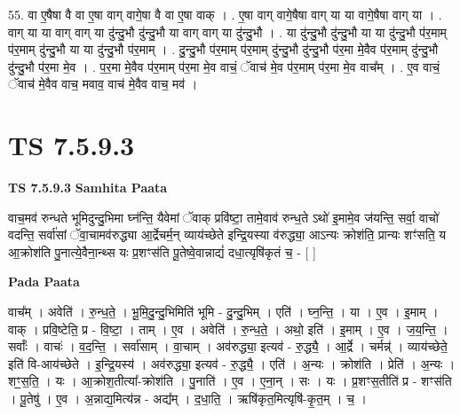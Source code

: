 \documentclass[17pt]{extarticle}
\begin{document}
55. वा ए॒षैषा वै वा ए॒षा वाग् वागे॒षा वै वा ए॒षा वाक् । . ए॒षा वाग् वागे॒षैषा वाग् या या वागे॒षैषा वाग् या । . वाग् या या वाग् वाग् या दु॑न्दु॒भौ दु॑न्दु॒भौ या वाग् वाग् या दु॑न्दु॒भौ । . या दु॑न्दु॒भौ दु॑न्दु॒भौ या या दु॑न्दु॒भौ प॑र॒माम् प॑र॒माम् दु॑न्दु॒भौ या या दु॑न्दु॒भौ प॑र॒माम् । . दु॒न्दु॒भौ प॑र॒माम् प॑र॒माम् दु॑न्दु॒भौ दु॑न्दु॒भौ प॑र॒मा मे॒वैव प॑र॒माम् दु॑न्दु॒भौ दु॑न्दु॒भौ प॑र॒मा मे॒व । . प॒र॒मा मे॒वैव प॑र॒माम् प॑र॒मा मे॒व वाचं॒ ॅवाच॑ मे॒व प॑र॒माम् प॑र॒मा मे॒व वाच᳚म् । . ए॒व वाचं॒ ॅवाच॑ मे॒वैव वाच॒ मवाव॒ वाच॑ मे॒वैव वाच॒ मव॑ । \newline
\pagebreak
{}

\section{ TS 7.5.9.3 }

\textbf{TS 7.5.9.3 } \newline
\textbf{Samhita Paata} \newline

वाच॒मव॑ रुन्धते भूमिदुन्दु॒भिमा घ्न॑न्ति॒ यैवेमां ॅवाक् प्रवि॑ष्टा॒ तामे॒वाव॑ रुन्ध॒ते ऽथो॑ इ॒मामे॒व ज॑यन्ति॒ सर्वा॒ वाचो॑ वदन्ति॒ सर्वा॑सां ॅवा॒चामव॑रुद्ध्या आ॒र्द्रेचर्म॒न् व्याय॑च्छेते इन्द्रि॒यस्या व॑रुद्ध्या॒ आऽन्यः क्रोश॑ति॒ प्रान्यः शꣳ॑सति॒ य आ॒क्रोश॑ति पु॒नात्ये॒वैना॒न्थ्स यः प्र॒शꣳस॑ति पू॒तेष्वे॒वान्नाद्यं॑ दधा॒त्यृषि॑कृतं च॒ - [  ] \newline

\textbf{Pada Paata} \newline

वाच᳚म् । अवेति॑ । रु॒न्ध॒ते॒ । भू॒मि॒दु॒न्दु॒भिमिति॑ भूमि - दु॒न्दु॒भिम् । एति॑ । घ्न॒न्ति॒ । या । ए॒व । इ॒माम् । वाक् । प्रवि॒ष्टेति॒ प्र - वि॒ष्टा॒ । ताम् । ए॒व । अवेति॑ । रु॒न्ध॒ते॒ । अथो॒ इति॑ । इ॒माम् । ए॒व । ज॒य॒न्ति॒ । सर्वाः᳚ । वाचः॑ । व॒द॒न्ति॒ । सर्वा॑साम् । वा॒चाम् । अव॑रुद्ध्या॒ इत्यव॑ - रु॒द्ध्यै॒ । आ॒र्द्रे । चर्मन्न्॑ । व्याय॑च्छेते॒ इति॑ वि-आय॑च्छेते । इ॒न्द्रि॒यस्य॑ । अव॑रुद्ध्या॒ इत्यव॑ - रु॒द्ध्यै॒ । एति॑ । अ॒न्यः । क्रोश॑ति । प्रेति॑ । अ॒न्यः । शꣳ॒॒स॒ति॒ । यः । आ॒क्रोश॒तीत्या᳚-क्रोश॑ति । पु॒नाति॑ । ए॒व । ए॒ना॒न् । सः । यः । प्र॒शꣳस॒तीति॑ प्र - शꣳस॑ति । पू॒तेषु॑ । ए॒व । अ॒न्नाद्य॒मित्य॑न्न - अद्य᳚म् । द॒धा॒ति॒ । ऋषि॑कृत॒मित्यृषि॑-कृ॒त॒म् । च॒ ।  \newline
\end{document}

